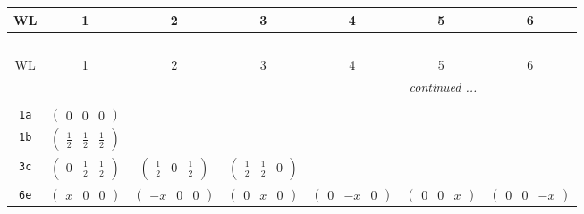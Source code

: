 \documentclass[fleqn,9pt,landscape]{jsarticle}
\begin{document}
\begin{center}
\renewcommand{\arraystretch}{1.2}
\begin{longtable}{ccccccc}
 \hline \hline
WL & 1 & 2 & 3 & 4 & 5 & 6 \\ \hline \endfirsthead

\multicolumn{6}{l}{\tablename\ \thetable{}} \\
 \hline \hline
WL & 1 & 2 & 3 & 4 & 5 & 6 \\ \hline \endhead

 \hline \hline
\multicolumn{6}{r}{\footnotesize\it continued ...} \\ \endfoot

 \hline \hline
\multicolumn{6}{r}{} \\ \endlastfoot

{\tt 1a} & $ \begin{pmatrix} 0 & 0 & 0 \end{pmatrix} $ & $  $ & $  $ & $  $ & $  $ & $  $ \\ \hline
{\tt 1b} & $ \begin{pmatrix} \frac{1}{2} & \frac{1}{2} & \frac{1}{2} \end{pmatrix} $ & $  $ & $  $ & $  $ & $  $ & $  $ \\ \hline
{\tt 3c} & $ \begin{pmatrix} 0 & \frac{1}{2} & \frac{1}{2} \end{pmatrix} $ & $ \begin{pmatrix} \frac{1}{2} & 0 & \frac{1}{2} \end{pmatrix} $ & $ \begin{pmatrix} \frac{1}{2} & \frac{1}{2} & 0 \end{pmatrix} $ & $  $ & $  $ & $  $ \\ \hline
{\tt 6e} & $ \begin{pmatrix} x & 0 & 0 \end{pmatrix} $ & $ \begin{pmatrix} - x & 0 & 0 \end{pmatrix} $ & $ \begin{pmatrix} 0 & x & 0 \end{pmatrix} $ & $ \begin{pmatrix} 0 & - x & 0 \end{pmatrix} $ & $ \begin{pmatrix} 0 & 0 & x \end{pmatrix} $ & $ \begin{pmatrix} 0 & 0 & - x \end{pmatrix} $ \\ \hline

\end{longtable}
\end{center}
\end{document}

